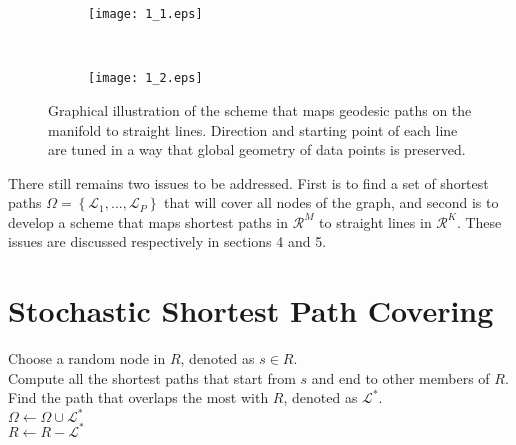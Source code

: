 \documentclass[10pt,journal,cspaper,compsoc]{IEEEtran}
\let\MYoriglatexcaption\caption
\renewcommand{\caption}[2][\relax]{\MYoriglatexcaption[#2]{#2}}
\begin{document}
\begin{figure}[t]
\centering
        \begin{subfigure}[b]{0.22\textwidth}
                \texttt{[image: 1\_1.eps]}
\end{subfigure}~
\begin{subfigure}[b]{0.22\textwidth}
                \texttt{[image: 1\_2.eps]}
\end{subfigure}\caption{{\small Graphical illustration of the scheme that maps geodesic paths on the manifold to straight lines. Direction and starting point of each line are tuned in a way that global geometry of data points is preserved.}}\label{fig_1_1}
\end{figure}

There still remains two issues to be addressed. First is to find a set of shortest paths $\Omega =\left\{ \mathcal{L}_1, ... , \mathcal{L}_P\right\}$ that will cover all nodes of the graph, and second is to develop a scheme that maps shortest paths in $\mathcal{R}^M$ to straight lines in $\mathcal{R}^K$. These issues are discussed respectively in sections 4 and 5. 

\section{Stochastic Shortest Path Covering}

\begin{algorithm}[b] 
 \begin{framed}
 \SetAlgoLined 
 {\vspace{1mm}
Choose a random node in $R$, denoted as $s\in R$.\vspace{1mm}\\
Compute all the shortest paths that start from $s$ and end to other members of $R$.\vspace{1mm}\\
Find the path that overlaps the most with $R$, denoted as $\mathcal{L}^*$.\vspace{1mm}\\
$\Omega\leftarrow\Omega\cup\mathcal{L}^*$\vspace{1mm}\\
$R\leftarrow R-\mathcal{L}^*$\vspace{1mm}
}  
 \end{framed}
 \vspace{-3mm}
\end{algorithm}
\end{document}
